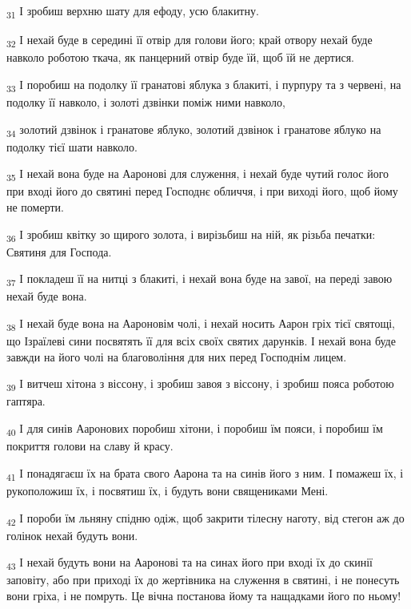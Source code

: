 \begin{tcolorbox}
\textsubscript{31} І зробиш верхню шату для ефоду, усю блакитну.
\end{tcolorbox}
\begin{tcolorbox}
\textsubscript{32} І нехай буде в середині її отвір для голови його; край отвору нехай буде навколо роботою ткача, як панцерний отвір буде їй, щоб їй не дертися.
\end{tcolorbox}
\begin{tcolorbox}
\textsubscript{33} І поробиш на подолку її гранатові яблука з блакиті, і пурпуру та з червені, на подолку її навколо, і золоті дзвінки поміж ними навколо,
\end{tcolorbox}
\begin{tcolorbox}
\textsubscript{34} золотий дзвінок і гранатове яблуко, золотий дзвінок і гранатове яблуко на подолку тієї шати навколо.
\end{tcolorbox}
\begin{tcolorbox}
\textsubscript{35} І нехай вона буде на Ааронові для служення, і нехай буде чутий голос його при вході його до святині перед Господнє обличчя, і при виході його, щоб йому не померти.
\end{tcolorbox}
\begin{tcolorbox}
\textsubscript{36} І зробиш квітку зо щирого золота, і вирізьбиш на ній, як різьба печатки: Святиня для Господа.
\end{tcolorbox}
\begin{tcolorbox}
\textsubscript{37} І покладеш її на нитці з блакиті, і нехай вона буде на завої, на переді завою нехай буде вона.
\end{tcolorbox}
\begin{tcolorbox}
\textsubscript{38} І нехай буде вона на Аароновім чолі, і нехай носить Аарон гріх тієї святощі, що Ізраїлеві сини посвятять її для всіх своїх святих дарунків. І нехай вона буде завжди на його чолі на благовоління для них перед Господнім лицем.
\end{tcolorbox}
\begin{tcolorbox}
\textsubscript{39} І витчеш хітона з віссону, і зробиш завоя з віссону, і зробиш пояса роботою гаптяра.
\end{tcolorbox}
\begin{tcolorbox}
\textsubscript{40} І для синів Ааронових поробиш хітони, і поробиш їм пояси, і поробиш їм покриття голови на славу й красу.
\end{tcolorbox}
\begin{tcolorbox}
\textsubscript{41} І понадягаєш їх на брата свого Аарона та на синів його з ним. І помажеш їх, і рукоположиш їх, і посвятиш їх, і будуть вони священиками Мені.
\end{tcolorbox}
\begin{tcolorbox}
\textsubscript{42} І пороби їм льняну спідню одіж, щоб закрити тілесну наготу, від стегон аж до голінок нехай будуть вони.
\end{tcolorbox}
\begin{tcolorbox}
\textsubscript{43} І нехай будуть вони на Ааронові та на синах його при вході їх до скинії заповіту, або при приході їх до жертівника на служення в святині, і не понесуть вони гріха, і не помруть. Це вічна постанова йому та нащадками його по ньому!
\end{tcolorbox}
